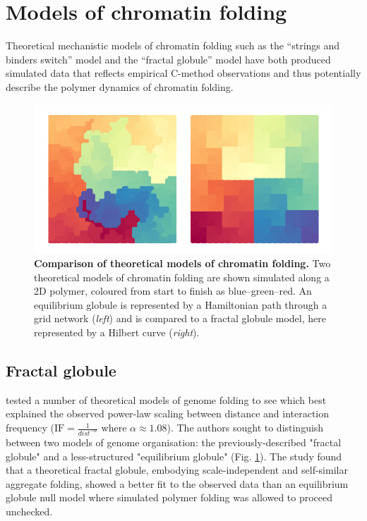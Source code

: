 \documentclass[a4paper,11pt,oneside]{book}
\begin{document}
\section{Models of chromatin folding}

Theoretical mechanistic models of chromatin folding such as the
``strings and binders switch'' model\cite{Barbieri2012} and the ``fractal
globule'' model\cite{Lieberman2009, Mirny2011, Grosberg1988a} have both produced simulated data
that reflects empirical C-method observations and thus potentially describe the polymer
dynamics of chromatin folding.

\begin{figure}
\begin{center}
\includegraphics[width=5.5in]{fractals.pdf}
\captionsetup{width=\textwidth}
\caption[ Comparison of theoretical models of chromatin folding. ]{ {\bf Comparison of theoretical models of chromatin folding. } 
 Two theoretical models of chromatin folding are shown simulated along a 2D polymer, coloured from start to finish as blue--green--red. An equilibrium globule is represented by a Hamiltonian path through a grid network (\emph{left}) and is compared to a fractal globule model, here represented by a Hilbert curve (\emph{right}).
}\label{fig:fractals}
\end{center}
\end{figure} 

\subsection{Fractal globule}
\citet{Lieberman2009} tested a number of theoretical models of genome folding to see which best explained the observed power-law scaling between distance and interaction frequency ($\textrm{IF} =  \frac{1}{dist^{-\alpha}}$ where $\alpha \approx 1.08$).  The authors sought to distinguish between two models of genome organisation: the previously-described "fractal globule"\cite{Grosberg1993, Grosberg1988a} and a less-structured "equilibrium globule" (Fig. \ref{fig:fractals}). The study found that a theoretical fractal globule, embodying scale-independent and self-similar aggregate folding, showed a better fit to the observed data than an equilibrium globule null model where simulated polymer folding was allowed to proceed unchecked.
\end{document}
